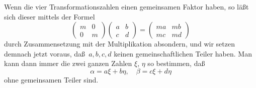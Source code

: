 \documentclass[12pt,a4paper]{article}
\begin{document}
\newpage
\noindent
Wenn die vier Transformationszahlen einen gemeinsamen Faktor haben, so l\"a\ss t sich dieser mittels der Formel
\[
\begin{pmatrix} m & 0 \\ 0 & m \end{pmatrix}\begin{pmatrix} a & b \\ c & d \end{pmatrix} = \begin{pmatrix} ma & mb \\ mc & md \end{pmatrix}
\]
durch Zusammensetzung mit der Multiplikation absondern, und wir setzen demnach jetzt voraus, da\ss\ $a,b,c,d$ keinen gemeinschaftlichen Teiler haben. Man kann dann immer die zwei ganzen Zahlen $\xi$, $\eta$ so bestimmen, da\ss
\begin{equation}\label{eq:29_3}
\alpha = a\xi+b\eta,\quad \beta = c\xi+d\eta
\end{equation}
ohne gemeinsamen Teiler sind.
\end{document}
